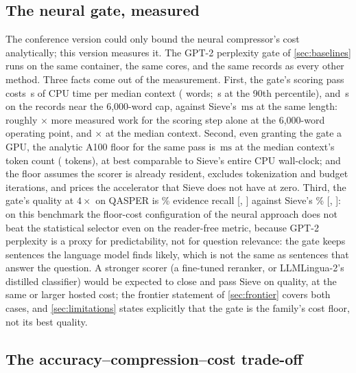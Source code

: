 \documentclass[preprint,12pt]{elsarticle}
\theoremstyle{remark}
\newcommand{\method}{Sieve}
\newcommand{\ms}{\ensuremath{\mathrm{ms}}}
\begin{document}
\subsection{The neural gate, measured}
\label{sec:gate}
The conference version could only bound the neural compressor's cost
analytically; this version measures it. The GPT-2 perplexity gate of
\autoref{sec:baselines} runs on the same container, the same cores,
and the same records as every other method. Three facts come out of
the measurement. First, the gate's scoring pass costs
\GateLatMedS\,s of CPU time per median context (\GateMedWords{} words;
\GateLatPnineS\,s at the 90th percentile), and \GateLatSixkS\,s on the
\GateSixkN{} records near the 6{,}000-word cap, against \method{}'s
\TimeSieSixk\,\ms{} at the same length: roughly
\GateSieRatioSixk$\times$ more measured work for the scoring step
alone at the 6{,}000-word operating point, and
\GateSieRatioMed$\times$ at the median context. Second, even granting
the gate a GPU, the analytic A100 floor for the same pass is
\GateAOneFloorMs\,\ms{} at the median context's token count
(\GateMedTok{} tokens), at best comparable to \method{}'s entire CPU
wall-clock; and the floor assumes the scorer is already resident,
excludes tokenization and budget iterations, and prices the accelerator
that \method{} does not have at zero. Third, the gate's quality at
$4\times$ on QASPER is \GateRecall\% evidence recall
[\GateRecallLo, \GateRecallHi] against \method{}'s \RecQSie\%
[\RecQSieLo, \RecQSieHi]: on this benchmark the floor-cost
configuration of the neural approach does not beat the statistical
selector even on the reader-free metric, because GPT-2 perplexity is
a proxy for predictability, not for question relevance: the gate keeps
sentences the language model finds likely, which is not the same as
sentences that answer the question. A stronger scorer (a fine-tuned
reranker, or LLMLingua-2's distilled classifier) would be expected to
close and pass \method{} on quality, at the same or larger hosted
cost; the frontier statement of \autoref{sec:frontier} covers both
cases, and \autoref{sec:limitations} states explicitly that the gate
is the family's cost floor, not its best quality.

\subsection{The accuracy--compression--cost trade-off}
\label{sec:threeway}
\end{document}
